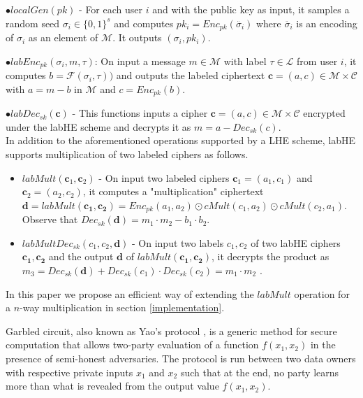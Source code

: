 $\bullet localGen(pk)$ -  For each user $i$ and with the public key as input, it samples a random seed $\sigma_i \in \{0,1\}^s$ and computes $pk_i = Enc_{pk}(\ddot{\sigma_i})$ where $\ddot{\sigma_i}$ is an  encoding of $\sigma_i$ as an  element of $\mathcal{M}$. It outputs $(\sigma_i,pk_i)$.

$\bullet labEnc_{pk}(\sigma_i, m , \tau)$: On input a message $m \in \mathcal{M} $ with label $\tau \in \mathcal{L}$  from user $i$, it computes $b=\mathcal{F}(\sigma_i, \tau))$ and outputs the labeled ciphertext $\mathbf{c}=(a,c) \in \mathcal{M} \times \mathcal{C}$ with $ a= m- b$ in $\mathcal{M}$ and $c=Enc_{pk}(b)$.

$\bullet labDec_{sk}(\mathbf{c})$ - This functions inputs a cipher $\mathbf{c}=(a,c) \in \mathcal{M} \times \mathcal{C}$ encrypted under the labHE scheme and decrypts it as $m=a-Dec_{sk}(c)$.
\\
In addition to the aforementioned operations supported by a \textsf{LHE}  scheme, \textsf{labHE} supports multiplication of two labeled ciphers as follows.
\begin{itemize}\item $labMult(\mathbf{c}_1,\mathbf{c}_2)$ -
On input two labeled ciphers $\mathbf{c}_1=(a_1,c_1)$ and $\mathbf{c}_2=(a_2,c_2)$, it computes a "multiplication" ciphertext $\mathbf{d}=labMult(\mathbf{c_1,c_2})=Enc_{pk}(a_1,a_2)\odot cMult(c_1,a_2) \odot cMult(c_2,a_1)$. Observe that $Dec_{sk}(\mathbf{d})=m_1\cdot m_2 -b_1 \cdot b_2$.
\item $labMultDec_{sk}(c_1,c_2,\mathbf{d})$ - On input two labels $c_1,c_2$ of two labHE ciphers $\mathbf{c_1},\mathbf{c_2}$ and the output $\mathbf{d}$ of $labMult(\mathbf{c_1},\mathbf{c_2})$, it decrypts the product as $m_3=Dec_{sk}(\mathbf{d})+Dec_{sk}(c_1)\cdot Dec_{sk}(c_2) = m_1\cdot m_2$ .    \end{itemize}
In this paper we propose an efficient way of extending the $labMult$ operation for a $n$-way multiplication in section \ref{implementation}.


Garbled circuit, also known as Yao's protocol \cite{Yao,yao2},  is a generic method for secure  computation that allows two-party evaluation of a function $f(x_1,x_2)$ in the presence of semi-honest adversaries. The protocol is run between two data owners with respective private inputs $x_1$ and $x_2$ such that at the end, no party learns more  
than what is revealed from the output value $f(x_1,x_2)$.  

